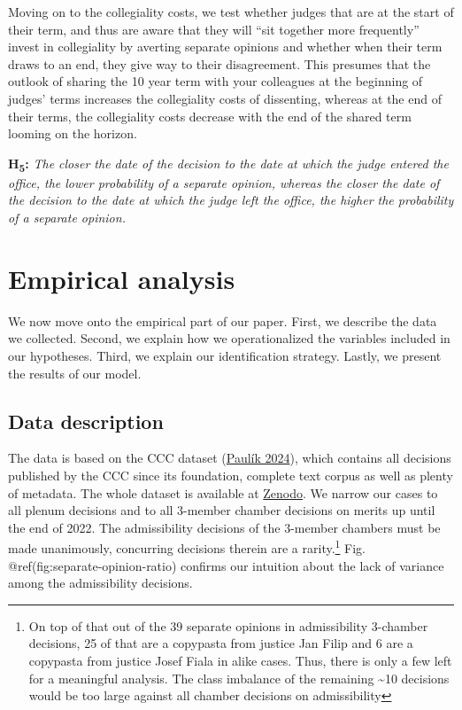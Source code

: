\documentclass[
  11pt,
]{article}
\begin{document}
Moving on to the collegiality costs, we test whether judges that are at
the start of their term, and thus are aware that they will ``sit
together more frequently'' invest in collegiality by averting separate
opinions and whether when their term draws to an end, they give way to
their disagreement. This presumes that the outlook of sharing the 10
year term with your colleagues at the beginning of judges' terms
increases the collegiality costs of dissenting, whereas at the end of
their terms, the collegiality costs decrease with the end of the shared
term looming on the horizon.

\textbf{H\textsubscript{5}:} \emph{The closer the date of the decision
to the date at which the judge entered the office, the lower probability
of a separate opinion, whereas the closer the date of the decision to
the date at which the judge left the office, the higher the probability
of a separate opinion.}

\hypertarget{empirics}{%
\section{Empirical analysis}\label{empirics}}

We now move onto the empirical part of our paper. First, we describe the
data we collected. Second, we explain how we operationalized the
variables included in our hypotheses. Third, we explain our
identification strategy. Lastly, we present the results of our model.

\hypertarget{data-description}{%
\subsection{Data description}\label{data-description}}

The data is based on the CCC dataset
(\protect\hyperlink{ref-paulikCzechConstitutionalCourt2024}{Paulík
2024}), which contains all decisions published by the CCC since its
foundation, complete text corpus as well as plenty of metadata. The
whole dataset is available at
\href{https://zenodo.org/records/10591110}{Zenodo}. We narrow our cases
to all plenum decisions and to all 3-member chamber decisions on merits
up until the end of 2022. The admissibility decisions of the 3-member
chambers must be made unanimously, concurring decisions therein are a
rarity.\footnote{On top of that out of the 39 separate opinions in
  admissibility 3-chamber decisions, 25 of that are a copypasta from
  justice Jan Filip and 6 are a copypasta from justice Josef Fiala in
  alike cases. Thus, there is only a few left for a meaningful analysis.
  The class imbalance of the remaining \textasciitilde10 decisions would
  be too large against all chamber decisions on admissibility} Fig.
@ref(fig:separate-opinion-ratio) confirms our intuition about the lack
of variance among the admissibility decisions.
\end{document}
